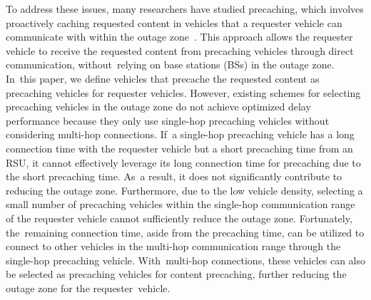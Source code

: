 \documentclass[electronics,aricle,accept,pdftex,moreauthors]{Definitions/mdpi}
\begin{document}
To address these issues, many researchers have studied precaching, which involves proactively caching requested content in vehicles that a requester vehicle can communicate with within the outage zone~\cite{Wu2013, Guo2017, Wang2017, Park2019, Bang2020, Wang2021, Nam2023}. This approach allows the requester vehicle to receive the requested content from precaching vehicles through direct communication, without~relying on base stations (BSs) in the outage zone. In~this paper, we define vehicles that precache the requested content as precaching vehicles for requester vehicles.
However, existing schemes for selecting precaching vehicles in the outage zone do not achieve optimized delay performance because they only use single-hop precaching vehicles without considering multi-hop connections. If~a single-hop precaching vehicle has a long connection time with the requester vehicle but a short precaching time from an RSU, it cannot effectively leverage its long connection time for precaching due to the short precaching time. As~a result, it does not significantly contribute to reducing the outage zone.
Furthermore, due to the low vehicle density, selecting a small number of precaching vehicles within the single-hop communication range of the requester vehicle cannot sufficiently reduce the outage zone.
Fortunately, the~remaining connection time, aside from the precaching time, can be utilized to connect to other vehicles in the multi-hop communication range through the single-hop precaching vehicle. With~multi-hop connections, these vehicles can also be selected as precaching vehicles for content precaching, further reducing the outage zone for the requester~vehicle.
\end{document}
